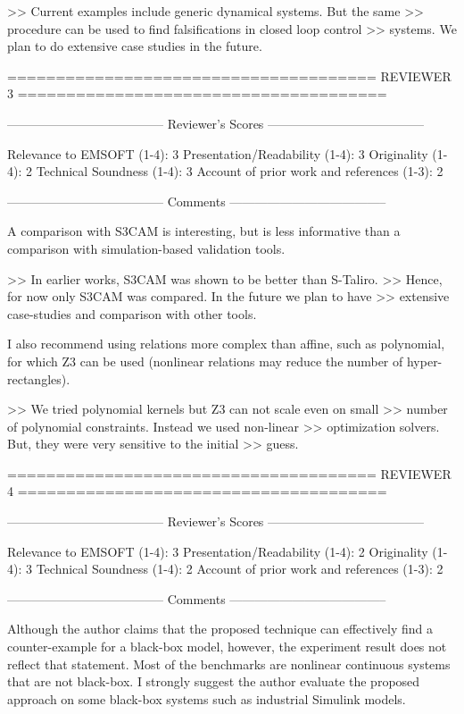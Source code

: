 >> Current examples include generic dynamical systems. But the same
>> procedure can be used to find falsifications in closed loop control
>> systems. We plan to do extensive case studies in the future.


======================================
                            REVIEWER 3
======================================


--------------------------------------
Reviewer's Scores
--------------------------------------

               Relevance to EMSOFT (1-4): 3
          Presentation/Readability (1-4): 3
                       Originality (1-4): 2
               Technical Soundness (1-4): 3
Account of prior work and references (1-3): 2


--------------------------------------
Comments
--------------------------------------

A comparison with S3CAM is interesting, but is less informative than a
comparison with simulation-based validation tools.

>> In earlier works, S3CAM was shown to be better than S-Taliro.
>> Hence, for now only S3CAM was compared. In the future we plan to have
>> extensive case-studies and comparison with other tools.

I also recommend using relations more complex than affine, such as
polynomial, for which Z3 can be used (nonlinear relations may reduce
the number of hyper-rectangles).

>> We tried polynomial kernels but Z3 can not scale even on small
>> number of polynomial constraints. Instead we used non-linear
>> optimization solvers. But, they were very sensitive to the initial
>> guess.


======================================
                            REVIEWER 4
======================================


--------------------------------------
Reviewer's Scores
--------------------------------------

               Relevance to EMSOFT (1-4): 3
          Presentation/Readability (1-4): 2
                       Originality (1-4): 3
               Technical Soundness (1-4): 2
Account of prior work and references (1-3): 2


--------------------------------------
Comments
--------------------------------------

Although the author claims that the proposed technique can effectively find a
counter-example for a black-box model, however, the experiment result does not
reflect that statement. Most of the benchmarks are nonlinear continuous systems
that are not black-box. I strongly suggest the author evaluate the proposed
approach on some black-box systems such as industrial Simulink models.

